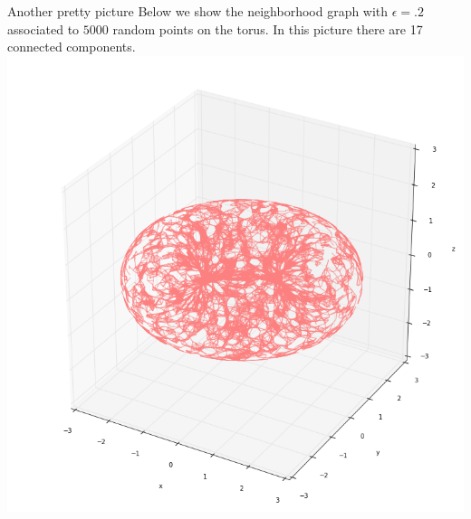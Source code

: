 \documentclass{beamer}
\begin{document}
\begin{frame}{}
\begin{columns}[t]
\begin{column}{0.32\linewidth}
\begin{block}{Another pretty picture}
\justify
Below we show the neighborhood graph with $\epsilon=.2$ associated to $5000$
random points on the torus. In this picture there are 17 connected components.
\\
\centering
\includegraphics[width=.7\columnwidth]{torus.png}

\end{block}

\end{column}%

\end{columns}
\end{frame}
\end{document}
